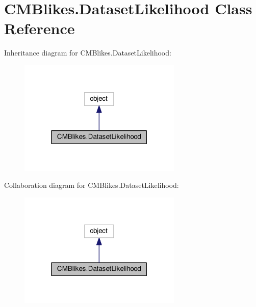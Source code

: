 \hypertarget{classCMBlikes_1_1DatasetLikelihood}{}\section{C\+M\+Blikes.\+Dataset\+Likelihood Class Reference}
\label{classCMBlikes_1_1DatasetLikelihood}


Inheritance diagram for C\+M\+Blikes.\+Dataset\+Likelihood\+:
\nopagebreak
\begin{figure}[H]
\begin{center}
\leavevmode
\includegraphics[width=220pt]{classCMBlikes_1_1DatasetLikelihood__inherit__graph}
\end{center}
\end{figure}


Collaboration diagram for C\+M\+Blikes.\+Dataset\+Likelihood\+:
\nopagebreak
\begin{figure}[H]
\begin{center}
\leavevmode
\includegraphics[width=220pt]{classCMBlikes_1_1DatasetLikelihood__coll__graph}
\end{center}
\end{figure}
